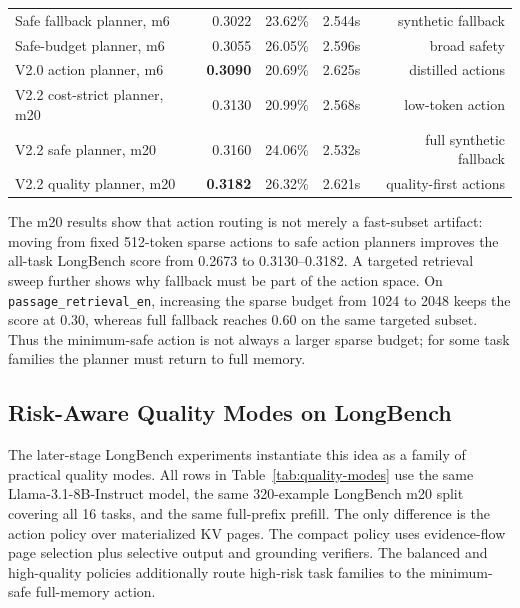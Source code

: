 \documentclass{article}
\begin{document}
\begin{table}[t]
\begin{tabular}{lrrrr}
Safe fallback planner, m6 & 0.3022 & 23.62\% & 2.544s & synthetic fallback \\
Safe-budget planner, m6 & 0.3055 & 26.05\% & 2.596s & broad safety \\
V2.0 action planner, m6 & \textbf{0.3090} & 20.69\% & 2.625s & distilled actions \\
V2.2 cost-strict planner, m20 & 0.3130 & 20.99\% & 2.568s & low-token action \\
V2.2 safe planner, m20 & 0.3160 & 24.06\% & 2.532s & full synthetic fallback \\
V2.2 quality planner, m20 & \textbf{0.3182} & 26.32\% & 2.621s & quality-first actions \\
\bottomrule
\end{tabular}
\end{table}

The m20 results show that action routing is not merely a fast-subset artifact:
moving from fixed 512-token sparse actions to safe action planners improves the all-task LongBench score from 0.2673 to 0.3130--0.3182.
A targeted retrieval sweep further shows why fallback must be part of the action space.
On \texttt{passage\_retrieval\_en}, increasing the sparse budget from 1024 to 2048 keeps the score at 0.30, whereas full fallback reaches 0.60 on the same targeted subset.
Thus the minimum-safe action is not always a larger sparse budget; for some task families the planner must return to full memory.

\subsection{Risk-Aware Quality Modes on LongBench}

The later-stage LongBench experiments instantiate this idea as a family of practical quality modes.
All rows in Table~\ref{tab:quality-modes} use the same Llama-3.1-8B-Instruct model, the same 320-example LongBench m20 split covering all 16 tasks, and the same full-prefix prefill.
The only difference is the action policy over materialized KV pages.
The compact policy uses evidence-flow page selection plus selective output and grounding verifiers.
The balanced and high-quality policies additionally route high-risk task families to the minimum-safe full-memory action.
\end{document}
